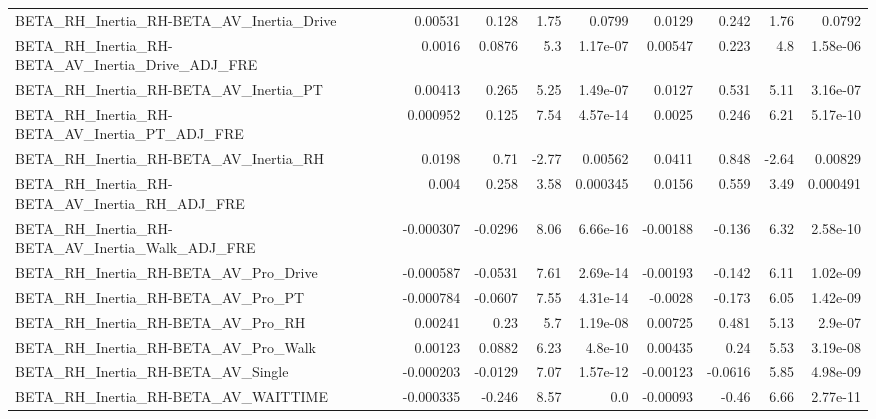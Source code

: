 \begin{tabular}{lrrrrrrrr}
BETA\_RH\_Inertia\_RH-BETA\_AV\_Inertia\_Drive           &     0.00531 &        0.128 &     1.75 &   0.0799 &     0.0129 &       0.242 &         1.76 &        0.0792 \\
BETA\_RH\_Inertia\_RH-BETA\_AV\_Inertia\_Drive\_ADJ\_FRE   &      0.0016 &       0.0876 &      5.3 & 1.17e-07 &    0.00547 &       0.223 &          4.8 &      1.58e-06 \\
BETA\_RH\_Inertia\_RH-BETA\_AV\_Inertia\_PT              &     0.00413 &        0.265 &     5.25 & 1.49e-07 &     0.0127 &       0.531 &         5.11 &      3.16e-07 \\
BETA\_RH\_Inertia\_RH-BETA\_AV\_Inertia\_PT\_ADJ\_FRE      &    0.000952 &        0.125 &     7.54 & 4.57e-14 &     0.0025 &       0.246 &         6.21 &      5.17e-10 \\
BETA\_RH\_Inertia\_RH-BETA\_AV\_Inertia\_RH              &      0.0198 &         0.71 &    -2.77 &  0.00562 &     0.0411 &       0.848 &        -2.64 &       0.00829 \\
BETA\_RH\_Inertia\_RH-BETA\_AV\_Inertia\_RH\_ADJ\_FRE      &       0.004 &        0.258 &     3.58 & 0.000345 &     0.0156 &       0.559 &         3.49 &      0.000491 \\
BETA\_RH\_Inertia\_RH-BETA\_AV\_Inertia\_Walk\_ADJ\_FRE    &   -0.000307 &      -0.0296 &     8.06 & 6.66e-16 &   -0.00188 &      -0.136 &         6.32 &      2.58e-10 \\
BETA\_RH\_Inertia\_RH-BETA\_AV\_Pro\_Drive               &   -0.000587 &      -0.0531 &     7.61 & 2.69e-14 &   -0.00193 &      -0.142 &         6.11 &      1.02e-09 \\
BETA\_RH\_Inertia\_RH-BETA\_AV\_Pro\_PT                  &   -0.000784 &      -0.0607 &     7.55 & 4.31e-14 &    -0.0028 &      -0.173 &         6.05 &      1.42e-09 \\
BETA\_RH\_Inertia\_RH-BETA\_AV\_Pro\_RH                  &     0.00241 &         0.23 &      5.7 & 1.19e-08 &    0.00725 &       0.481 &         5.13 &       2.9e-07 \\
BETA\_RH\_Inertia\_RH-BETA\_AV\_Pro\_Walk                &     0.00123 &       0.0882 &     6.23 &  4.8e-10 &    0.00435 &        0.24 &         5.53 &      3.19e-08 \\
BETA\_RH\_Inertia\_RH-BETA\_AV\_Single                  &   -0.000203 &      -0.0129 &     7.07 & 1.57e-12 &   -0.00123 &     -0.0616 &         5.85 &      4.98e-09 \\
BETA\_RH\_Inertia\_RH-BETA\_AV\_WAITTIME                &   -0.000335 &       -0.246 &     8.57 &      0.0 &   -0.00093 &       -0.46 &         6.66 &      2.77e-11 \\

\end{tabular}

